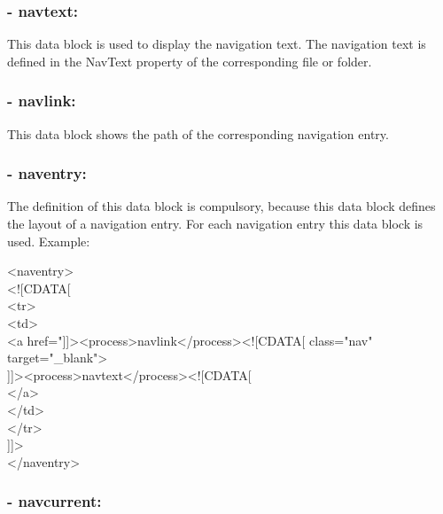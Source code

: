 \subsubsection{- navtext:} 
  This data block is used to display the navigation text. 
The navigation text is defined in the {\name NavText} property 
of the corresponding file or folder. \\

\subsubsection{- navlink:} 

  This data block shows the path of the corresponding 
navigation entry.\\

\subsubsection{- naventry:} \index{}

  The definition of this data block is compulsory, because 
this data block defines the layout of a navigation entry. 
For each navigation entry this data block is used. Example: \\

  \begin{xml}
  <naventry> \\
  <![CDATA[ \\
  <tr> \\
  \xtaba <td> \\
  \xtabb   <a href="]]><process>navlink</process><![CDATA[ class="nav" target="\_blank"> \\
  \xtabc      ]]><process>navtext</process><![CDATA[ \\
  \xtabb   </a> \\
  \xtaba </td> \\
  </tr> \\
  ]]> \\
  </naventry> \\
  \end{xml}

\subsubsection{- navcurrent:} 

